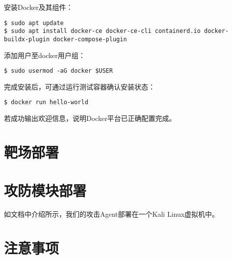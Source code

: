 \documentclass[lang=cn,10pt]{elegantbook}
\begin{document}
安装Docker及其组件：

\begin{verbatim}
$ sudo apt update
$ sudo apt install docker-ce docker-ce-cli containerd.io docker-buildx-plugin docker-compose-plugin
\end{verbatim}

添加用户至docker用户组：

\begin{verbatim}
$ sudo usermod -aG docker $USER
\end{verbatim}

完成安装后，可通过运行测试容器确认安装状态：

\begin{verbatim}
$ docker run hello-world
\end{verbatim}

若成功输出欢迎信息，说明Docker平台已正确配置完成。


\section{靶场部署}


\section{攻防模块部署}

如文档中介绍所示，我们的攻击Agent部署在一个Kali Linux虚拟机中。

\section{注意事项}





\end{document}
